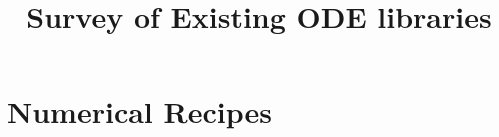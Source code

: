 \documentclass[a4paper,10pt]{article}
\title{Survey of Existing ODE libraries}
\begin{document}
 \maketitle

\section{Numerical Recipes}
\end{document}

